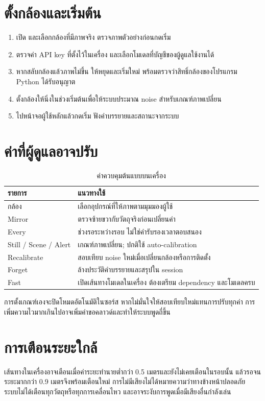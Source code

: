 \section{ตั้งกล้องและเริ่มต้น}
\begin{enumerate}
\item เปิด  และเลือกกล้องที่มีภาพจริง ตรวจภาพตัวอย่างก่อนกดเริ่ม
\item ตรวจค่า API key ที่ตั้งไว้ในเครื่อง และเลือกโมเดลที่บัญชีของผู้ดูแลใช้งานได้
\item หากสลับกล้องแล้วภาพไม่ขึ้น ให้หยุดและเริ่มใหม่ พร้อมตรวจว่าสิทธิ์กล้องของโปรแกรม Python ได้รับอนุญาต
\item ตั้งกล้องให้นิ่งในช่วงเริ่มต้นเพื่อให้ระบบประมาณ noise สำหรับเกณฑ์ภาพเปลี่ยน
\item ไปหน้าจอผู้ใช้หลักแล้วกดเริ่ม ฟังคำบรรยายและสถานะจากระบบ
\end{enumerate}

\section{ค่าที่ผู้ดูแลอาจปรับ}
\begin{table}[H]\centering\caption{ค่าควบคุมต้นแบบบนเครื่อง}
\begin{tabularx}{\linewidth}{lY}\toprule รายการ & แนวทางใช้\\\midrule
กล้อง & เลือกอุปกรณ์ที่ให้ภาพตามมุมมองผู้ใช้\\
Mirror & ตรวจซ้ายขวากับวัตถุจริงก่อนเปลี่ยนค่า\\
Every & ช่วงรอระหว่างรอบ ไม่ใช่คำรับรองเวลาตอบสนอง\\
Still / Scene / Alert & เกณฑ์ภาพเปลี่ยน; ปกติใช้ auto-calibration\\
Recalibrate & สอบเทียบ noise ใหม่เมื่อเปลี่ยนกล้องหรือการติดตั้ง\\
Forget & ล้างประวัติคำบรรยายและสรุปใน session\\
Fast & เปิดเส้นทางโมเดลในเครื่อง ต้องเตรียม dependency และโมเดลครบ\\\bottomrule
\end{tabularx}\end{table}

การตั้งเกณฑ์เองจะปิดโหมดอัตโนมัติในซอร์ส หากไม่มั่นใจให้สอบเทียบใหม่แทนการปรับทุกค่า การเพิ่มความไวมากเกินไปอาจเพิ่มคำขอคลาวด์และทำให้ระบบพูดถี่ขึ้น

\section{การเตือนระยะใกล้}
เส้นทางในเครื่องอาจเตือนเมื่อค่าระยะทำนายต่ำกว่า 0.5 เมตรและยังไม่เคยเตือนในรอบนั้น แล้วรอจนระยะมากกว่า 0.9 เมตรจึงพร้อมเตือนใหม่ การไม่มีเสียงไม่ได้หมายความว่าทางข้างหน้าปลอดภัย ระบบไม่ได้เตือนทุกวัตถุหรือทุกการเคลื่อนไหว และอาจระงับการพูดเมื่อมีเสียงอื่นกำลังเล่น

